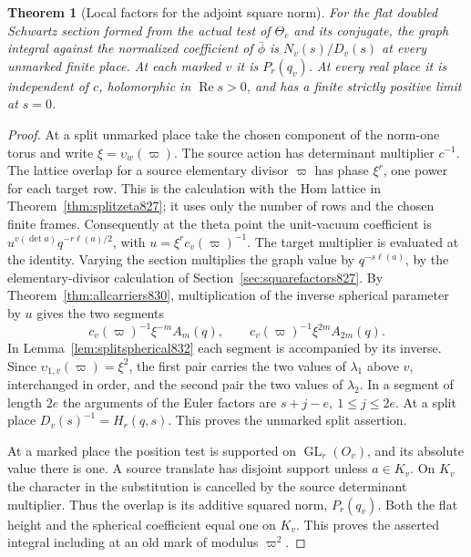 \documentclass[a4paper,11pt]{article}
\newtheorem{theorem}[proposition]{Theorem}
\theoremstyle{definition}
\theoremstyle{remark}
\numberwithin{equation}{section}
\begin{document}
\begin{theorem}[Local factors for the adjoint square norm]
\leavevmode\label{thm:secondlocal832}
For the flat doubled Schwartz section formed from the actual
test of \(\Theta_c\) and its conjugate, the graph integral
against the normalized coefficient of \(\bar\phi\) is
\(N_v(s)/D_v(s)\) at every unmarked finite place. At each
marked \(v\) it is \(P_r(q_v)\). At every real place it
is independent of \(c\), holomorphic in \(\operatorname{Re}s>0\),
and has a finite strictly positive limit at \(s=0\).
\end{theorem}
\begin{proof}
At a split unmarked place take the chosen component of the
norm-one torus and write \(\xi=\upsilon_w(\varpi)\). The
source action has determinant multiplier \(c^{-1}\).
The lattice overlap for a source elementary divisor \(\varpi\)
has phase \(\xi^r\), one power for each target row. This is
the calculation with the Hom lattice in Theorem~\ref{thm:splitzeta827};
it uses only the number of rows and the chosen finite frames.
Consequently at the theta point the unit-vacuum coefficient
is \(u^{v(\det a)}q^{-r\ell(a)/2}\), with
\(u=\xi^r c_v(\varpi)^{-1}\). The target multiplier is
evaluated at the identity. Varying the section multiplies
the graph value by \(q^{-s\ell(a)}\), by the elementary-divisor
calculation of Section~\ref{sec:squarefactors827}. By
Theorem~\ref{thm:allcarriers830}, multiplication of the
inverse spherical parameter by \(u\) gives the two segments
\[
             c_v(\varpi)^{-1}\xi^{-m} A_m(q),\qquad
             c_v(\varpi)^{-1}\xi^{2m} A_{2m}(q).
\]
In Lemma~\ref{lem:splitspherical832} each segment is accompanied
by its inverse. Since \(\upsilon_{1,v}(\varpi)=\xi^2\),
the first pair carries the two values of \(\lambda_1\) above
\(v\), interchanged in order, and the second pair the two
values of \(\lambda_2\). In a segment of length \(2e\) the
arguments of the Euler factors are \(s+j-e,\ 1\le j\le2e\).
At a split place \(D_v(s)^{-1}=H_r(q,s)\).
This proves the unmarked split assertion.

At a marked place the position test is supported on
\(\operatorname{GL}_r(O_v)\), and its absolute value there is
one. A source translate has disjoint support unless \(a\in K_v\).
On \(K_v\) the character in the substitution is cancelled by
the source determinant multiplier. Thus the overlap is its
additive squared norm, \(P_r(q_v)\). Both the flat height and
the spherical coefficient equal one on \(K_v\). This proves
the asserted integral including at an old mark of modulus
\(\varpi^2\).


\end{proof}
\end{document}

